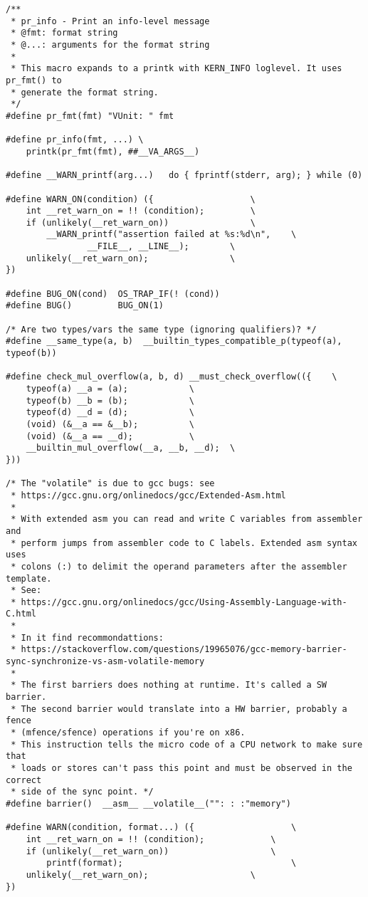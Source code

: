 \documentclass{article}
\begin{document}
\begin{lstlisting}[style=CStyle]
/**
 * pr_info - Print an info-level message
 * @fmt: format string
 * @...: arguments for the format string
 *
 * This macro expands to a printk with KERN_INFO loglevel. It uses pr_fmt() to
 * generate the format string.
 */
#define pr_fmt(fmt) "VUnit: " fmt

#define pr_info(fmt, ...) \
	printk(pr_fmt(fmt), ##__VA_ARGS__)

#define __WARN_printf(arg...)	do { fprintf(stderr, arg); } while (0)

#define WARN_ON(condition) ({					\
	int __ret_warn_on = !! (condition);			\
	if (unlikely(__ret_warn_on))				\
		__WARN_printf("assertion failed at %s:%d\n",	\
				__FILE__, __LINE__);		\
	unlikely(__ret_warn_on);				\
})

#define BUG_ON(cond)  OS_TRAP_IF(! (cond))
#define BUG()	      BUG_ON(1)

/* Are two types/vars the same type (ignoring qualifiers)? */
#define __same_type(a, b)  __builtin_types_compatible_p(typeof(a), typeof(b))

#define check_mul_overflow(a, b, d) __must_check_overflow(({	\
	typeof(a) __a = (a);			\
	typeof(b) __b = (b);			\
	typeof(d) __d = (d);			\
	(void) (&__a == &__b);			\
	(void) (&__a == __d);			\
	__builtin_mul_overflow(__a, __b, __d);	\
}))

/* The "volatile" is due to gcc bugs: see
 * https://gcc.gnu.org/onlinedocs/gcc/Extended-Asm.html
 *
 * With extended asm you can read and write C variables from assembler and
 * perform jumps from assembler code to C labels. Extended asm syntax uses
 * colons (:) to delimit the operand parameters after the assembler template.
 * See:
 * https://gcc.gnu.org/onlinedocs/gcc/Using-Assembly-Language-with-C.html
 *
 * In it find recommondattions:
 * https://stackoverflow.com/questions/19965076/gcc-memory-barrier-sync-synchronize-vs-asm-volatile-memory
 *
 * The first barriers does nothing at runtime. It's called a SW barrier.
 * The second barrier would translate into a HW barrier, probably a fence
 * (mfence/sfence) operations if you're on x86.
 * This instruction tells the micro code of a CPU network to make sure that
 * loads or stores can't pass this point and must be observed in the correct
 * side of the sync point. */
#define barrier()  __asm__ __volatile__("": : :"memory")

#define WARN(condition, format...) ({					\
	int __ret_warn_on = !! (condition);				\
	if (unlikely(__ret_warn_on))					\
		printf(format);			                        \
	unlikely(__ret_warn_on);					\
})


\end{lstlisting}
\end{document}
